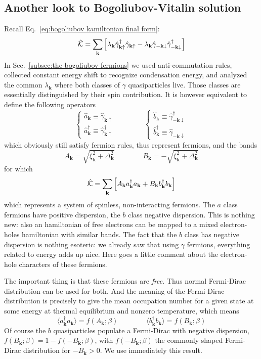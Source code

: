 \subsection{Another look to Bogoliubov-Vitalin solution}\label{subsec:another look to bogoliubov-vitalin solution}

Recall Eq.~\eqref{eq:bogoliubov kamiltonian final form}:
\[
	\hat{\mathcal{K}} =
	\sum_\mathbf{k} \left[{\lambda_\mathbf{k} \hat{\gamma}_{\mathbf{k}\uparrow}^\dagger \hat{\gamma}_{\mathbf{k}\uparrow} - \lambda_\mathbf{k} \hat{\gamma}_{-\mathbf{k}\downarrow}\hat{\gamma}_{-\mathbf{k}\downarrow}^\dagger}\right]
\]
In Sec.~\ref{subsec:the bogoliubov fermions} we used anti-commutation rules, collected constant energy shift to recognize condensation energy, and analyzed the common $\lambda_\mathbf{k}$ where both classes of $\gamma$ quasiparticles live. Those classes are essentially distinguished by their spin contribution. It is however equivalent to define the following operators
\[
\begin{cases}
	\hat{a}_\mathbf{k} \equiv \hat{\gamma}_{\mathbf{k}\uparrow} \\
	\hat{a}_\mathbf{k}^\dagger \equiv \hat{\gamma}_{\mathbf{k}\uparrow}^\dagger
\end{cases}
\qquad\qquad
\begin{cases}
	\hat{b}_\mathbf{k} \equiv \hat{\gamma}_{-\mathbf{k}\downarrow}^\dagger \\
	\hat{b}_\mathbf{k}^\dagger \equiv \hat{\gamma}_{-\mathbf{k}\downarrow}
\end{cases}
\]
which obviously still satisfy fermion rules, thus represent fermions, and the bands
\[
	A_\mathbf{k} = \sqrt{\xi_\mathbf{k}^2 + \Delta_\mathbf{k}^2}
	\qquad\qquad
	B_\mathbf{k} = - \sqrt{\xi_\mathbf{k}^2 + \Delta_\mathbf{k}^2}
\]
for which
\[
	\hat{\mathcal{K}} =
	\sum_\mathbf{k} \left[{A_\mathbf{k} a_\mathbf{k}^\dagger a_\mathbf{k} + B_\mathbf{k} b_\mathbf{k}^\dagger b_\mathbf{k}}\right]
\]
which represents a system of spinless, non-interacting fermions. The $a$ class fermions have positive dispersion, the $b$ class negative dispersion. This is nothing new: also an hamiltonian of free electrons can be mapped to a mixed electron-holes hamiltonian with similar bands. The fact that the $b$ class has negative dispersion is nothing esoteric: we already saw that using $\gamma$ fermions, everything related to energy adds up nice. {\color{red}Here goes a little comment about the electron-hole characters of these fermions.}

The important thing is that these fermions are \textit{free}. Thus normal Fermi-Dirac distribution can be used for both. And the meaning of the Fermi-Dirac distribution is precisely to give the mean occupation number for a given state at some energy at thermal equilibrium and nonzero temperature, which means
\[
	\big\langle a_\mathbf{k}^\dagger a_\mathbf{k} \big\rangle = f(A_\mathbf{k};\beta)
	\qquad\qquad
	\big\langle b_\mathbf{k}^\dagger b_\mathbf{k} \big\rangle = f(B_\mathbf{k};\beta)
\]
Of course the $b$ quasiparticles populate a Fermi-Dirac with negative dispersion, $f(B_\mathbf{k};\beta) = 1 - f(-B_\mathbf{k};\beta)$, with $f(-B_\mathbf{k};\beta)$ the commonly shaped Fermi-Dirac distribution for $-B_\mathbf{k}>0$. We use immediately this result.

